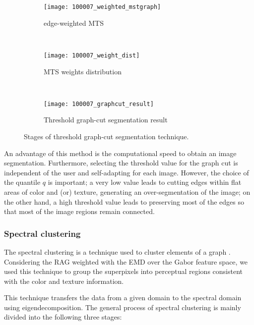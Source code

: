 \begin{figure}[!ht]
    \centering
    \begin{subfigure}[b]{0.32\textwidth}
    	\texttt{[image: 100007\_weighted\_mstgraph]}
    	\caption{edge-weighted MTS} 
    \end{subfigure}      
    ~ %
    \begin{subfigure}[b]{0.32\textwidth}
        \texttt{[image: 100007\_weight\_dist]}
        \caption{MTS weights distribution}
    \end{subfigure}    
    ~ %
    \begin{subfigure}[b]{0.45\textwidth}
        \texttt{[image: 100007\_graphcut\_result]}
        \caption{Threshold graph-cut segmentation result}
        \label{fig:graphcut_segmentation_result}
    \end{subfigure}  
	\caption{Stages of threshold graph-cut segmentation technique.}\label{fig:graphcut_segmentation_technique}    
\end{figure}

An advantage of this method is the computational speed to obtain an image segmentation. Furthermore, selecting the threshold value for the graph cut is independent of the user and self-adapting for each image. However, the choice of the quantile $q$ is important; a very low value leads to cutting edges within flat areas of color and (or) texture, generating an over-segmentation of the image; on the other hand, a high threshold value leads to preserving most of the edges so that most of the image regions remain connected.

\subsubsection{Spectral clustering}

The spectral clustering is a technique used to cluster elements of a graph \citep{Ng.Jordan.ea:NIPS:2001}. Considering the RAG weighted with the EMD over the Gabor feature space, we used this technique to group the superpixels into perceptual regions consistent with the color and texture information.

This technique transfers the data from a given domain to the spectral domain using eigendecomposition. The general process of spectral clustering is mainly divided into the following three stages:


